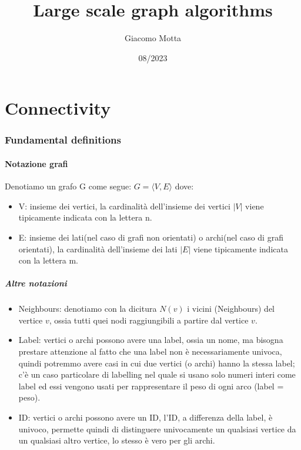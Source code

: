 \documentclass[12pt,a4paper]{article}
\title{Large scale graph algorithms}
\author{Giacomo Motta}
\date{08/2023}
\begin{document}
\maketitle
\tableofcontents

\pagebreak
\part{Connectivity}

\section{Fundamental definitions}

\subsection{Notazione grafi}
Denotiamo un grafo G come segue: $G = \langle V, E\rangle$ dove:
\begin{itemize}
\item V: insieme dei vertici, la cardinalità dell'insieme dei vertici $\vert V \vert$ viene tipicamente indicata con la lettera n.
\item E: insieme dei lati(nel caso di grafi non orientati) o archi(nel caso di grafi orientati), la cardinalità dell'insieme dei lati $\vert E \vert$ viene tipicamente indicata con la lettera m.
\end{itemize}

\subsubsection{Altre notazioni}
\begin{itemize}
\item Neighbours: denotiamo con la dicitura $N(v)$ i vicini (Neighbours) del vertice $v$, ossia tutti quei nodi raggiungibili a partire dal vertice $v$.
\item Label: vertici o archi possono avere una label, ossia un nome, ma bisogna prestare attenzione al fatto che una label non è necessariamente univoca, quindi potremmo avere casi in cui due vertici (o archi) hanno la stessa label; c'è un caso particolare di labelling nel quale si usano solo numeri interi come label ed essi vengono usati per rappresentare il peso di ogni arco (label = peso).

\item ID: vertici o archi possono avere un ID, l'ID, a differenza della label, è univoco, permette quindi di distinguere univocamente un qualsiasi vertice da un qualsiasi altro vertice, lo stesso è vero per gli archi.
\end{itemize}
\end{document}
